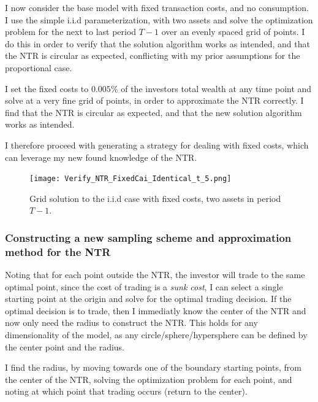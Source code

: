 \documentclass[11pt]{article}
\begin{document}
I now consider the base model with fixed transaction costs, and no consumption. I use the simple i.i.d parameterization, with two assets and solve the optimization problem for the next to last period $T-1$
over an evenly spaced grid of points. 
I do this in order to verify that the solution algorithm works as intended, and that the \ac{NTR} is circular as expected, conflicting with my prior assumptions for the proportional case.

I set the fixed costs to $0.005\%$ of the investors total wealth at any time point and solve at a very fine grid of points, in order to approximate the \ac{NTR} correctly.
I find that the \ac{NTR} is circular as expected, and that the new solution algorithm works as intended. 

I therefore proceed with generating a strategy for dealing with fixed costs, which can leverage my new found knowledge of the \ac{NTR}.
\begin{figure}[!ht]
    \centering
    \texttt{[image: Verify\_NTR\_FixedCai\_Identical\_t\_5.png]}
    \caption{Grid solution to the i.i.d case with fixed costs, two assets in period $T-1$.}
    \label{fig:NTR_verify_fixed_no_correlation}
\end{figure}

\subsubsection{Constructing a new sampling scheme and approximation method for the NTR} \label{Subsubsection: SampleFixed}
Noting that for each point outside the NTR, the investor will trade to the same optimal point, since the cost of trading is a \textit{sunk cost},
I can select a single starting point at the origin and solve for the optimal trading decision.
If the optimal decision is to trade, then I immediatly know the center of the \ac{NTR} and now only need the radius to construct the \ac{NTR}.
This holds for any dimensionality of the model, as any circle/sphere/hypersphere can be defined by the center point and the radius.

I find the radius, by moving towards one of the boundary starting points, from the center of the NTR, solving the optimization problem for each point,
and noting at which point that trading occurs (return to the center).
\end{document}
